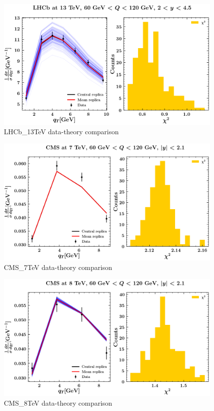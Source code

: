 \documentclass[
]{article}
\begin{document}
\begin{figure}
\centering
\includegraphics{pngplots/LHCb_13TeV.png}
\caption{LHCb\_13TeV data-theory comparison}
\end{figure}

\begin{figure}
\centering
\includegraphics{pngplots/CMS_7TeV.png}
\caption{CMS\_7TeV data-theory comparison}
\end{figure}

\begin{figure}
\centering
\includegraphics{pngplots/CMS_8TeV.png}
\caption{CMS\_8TeV data-theory comparison}
\end{figure}
\end{document}
